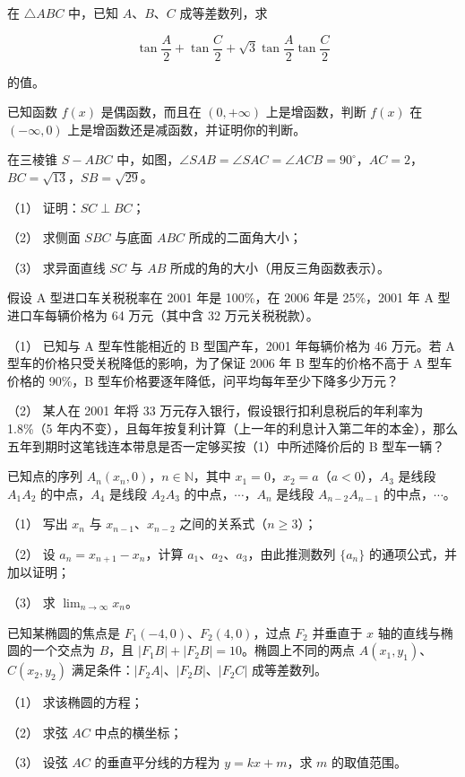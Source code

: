 \begin{question}
在 $\triangle ABC$ 中，已知 $A\text{、}B\text{、}C$ 成等差数列，求

\nopagebreak[4]
\[
\tan\frac A2+\tan\frac C2+\sqrt3\tan\frac A2\tan\frac C2
\]

的值。

\end{question}
\begin{question}
已知函数 $f(x)$ 是偶函数，而且在 $(0,+\infty)$ 上是增函数，判断 $f(x)$ 在 $(-\infty,0)$ 上是增函数还是减函数，并证明你的判断。

\Needspace{0.4\textheight}
\end{question}
\begin{question}
在三棱锥 $S-ABC$ 中，如图，$\angle SAB=\angle SAC=\angle ACB=90^\circ$，$AC=2$，$BC=\sqrt{13}$，$SB=\sqrt{29}$。
\nopagebreak[4]
\begin{center}\end{center}
\nopagebreak[4]
（1） 证明：$SC\perp BC$；

（2） 求侧面 $SBC$ 与底面 $ABC$ 所成的二面角大小；

（3） 求异面直线 $SC$ 与 $AB$ 所成的角的大小（用反三角函数表示）。

\end{question}
\begin{question}
假设 A 型进口车关税税率在 2001 年是 100\%，在 2006 年是 25\%，2001 年 A 型进口车每辆价格为 64 万元（其中含 32 万元关税税款）。

（1） 已知与 A 型车性能相近的 B 型国产车，2001 年每辆价格为 46 万元。若 A 型车的价格只受关税降低的影响，为了保证 2006 年 B 型车的价格不高于 A 型车价格的 90\%，B 型车价格要逐年降低，问平均每年至少下降多少万元？

（2） 某人在 2001 年将 33 万元存入银行，假设银行扣利息税后的年利率为 1.8\%（5 年内不变），且每年按复利计算（上一年的利息计入第二年的本金），那么五年到期时这笔钱连本带息是否一定够买按（1）中所述降价后的 B 型车一辆？

\end{question}
\begin{question}
已知点的序列 $A_n(x_n,0)$，$n\in\mathbb N$，其中 $x_1=0$，$x_2=a$（$a<0$），$A_3$ 是线段 $A_1A_2$ 的中点，$A_4$ 是线段 $A_2A_3$ 的中点，$\cdots$，$A_n$ 是线段 $A_{n-2}A_{n-1}$ 的中点，$\cdots$。

（1） 写出 $x_n$ 与 $x_{n-1}\text{、}x_{n-2}$ 之间的关系式（$n\ge3$）；

（2） 设 $a_n=x_{n+1}-x_n$，计算 $a_1\text{、}a_2\text{、}a_3$，由此推测数列 $\{a_n\}$ 的通项公式，并加以证明；

（3） 求 $\displaystyle\lim_{n\to\infty}x_n$。

\end{question}
\begin{question}
已知某椭圆的焦点是 $F_1(-4,0)$、$F_2(4,0)$，过点 $F_2$ 并垂直于 $x$ 轴的直线与椭圆的一个交点为 $B$，且 $|F_1B|+|F_2B|=10$。椭圆上不同的两点 $A(x_1,y_1)$、$C(x_2,y_2)$ 满足条件：$|F_2A|\text{、}|F_2B|\text{、}|F_2C|$ 成等差数列。

（1） 求该椭圆的方程；

（2） 求弦 $AC$ 中点的横坐标；

（3） 设弦 $AC$ 的垂直平分线的方程为 $y=kx+m$，求 $m$ 的取值范围。

\end{question}